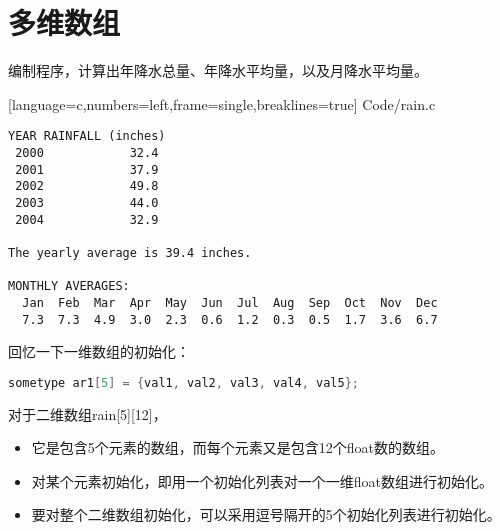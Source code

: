 \section{多维数组}

\begin{frame}[fragile]\ft{\secname} 
编制程序，计算出年降水总量、年降水平均量，以及月降水平均量。
\end{frame}

\begin{frame}\ft{\secname} 

[language=c,numbers=left,frame=single,breaklines=true]
{Code/rain.c}
\end{frame}


\begin{frame}[fragile]\ft{\secname}
\begin{lstlisting}[basicstyle=\ttfamily\scriptsize,backgroundcolor=\color{red!20}]
YEAR RAINFALL (inches)
 2000            32.4
 2001            37.9
 2002            49.8
 2003            44.0 
 2004            32.9

The yearly average is 39.4 inches.

MONTHLY AVERAGES:
  Jan  Feb  Mar  Apr  May  Jun  Jul  Aug  Sep  Oct  Nov  Dec
  7.3  7.3  4.9  3.0  2.3  0.6  1.2  0.3  0.5  1.7  3.6  6.7
\end{lstlisting}
\end{frame}

\begin{frame}[fragile]
回忆一下一维数组的初始化：
\begin{lstlisting}[language=c,backgroundcolor=\color{red!20}]
sometype ar1[5] = {val1, val2, val3, val4, val5};
\end{lstlisting}
\end{frame}

\begin{frame}[fragile]
对于二维数组{\tf rain[5][12]}， \vspace{0.1in}

\begin{itemize}
\item
\textcolor{acolor1}{它是包含5个元素的数组，而每个元素又是包含12个{\tf float}数的数组。}
\\[0.1in]
\item
对某个元素初始化，即用一个初始化列表对一个一维float数组进行初始化。\\[0.1in]
\item 
要对整个二维数组初始化，可以采用逗号隔开的5个初始化列表进行初始化。
\end{itemize}
\end{frame}


